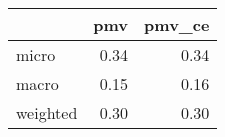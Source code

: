 \begin{tabular}{lrr}
\toprule
{} &   pmv &  pmv\_ce \\
\midrule
micro    &  0.34 &    0.34 \\
macro    &  0.15 &    0.16 \\
weighted &  0.30 &    0.30 \\
\bottomrule
\end{tabular}
